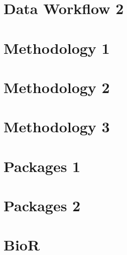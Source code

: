 \documentclass[11pt,oneside]{book}
\begin{document}
\chapter{Data Workflow 2}





\chapter{Methodology 1}




\chapter{Methodology 2}






\chapter{Methodology 3}

% 



\chapter{Packages 1}




% 


\chapter{Packages 2}




% 

\chapter{BioR}





\end{document}
